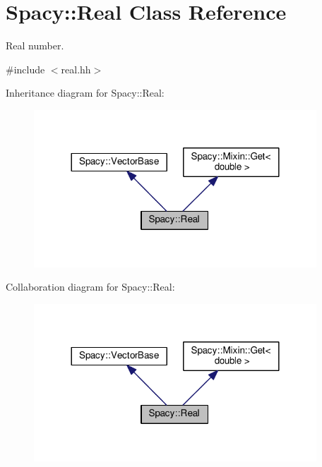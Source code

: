 \hypertarget{classSpacy_1_1Real}{}\section{Spacy\+:\+:Real Class Reference}
\label{classSpacy_1_1Real}


Real number.  




{\ttfamily \#include $<$real.\+hh$>$}



Inheritance diagram for Spacy\+:\+:Real\+:\nopagebreak
\begin{figure}[H]
\begin{center}
\leavevmode
\includegraphics[width=300pt]{classSpacy_1_1Real__inherit__graph}
\end{center}
\end{figure}


Collaboration diagram for Spacy\+:\+:Real\+:\nopagebreak
\begin{figure}[H]
\begin{center}
\leavevmode
\includegraphics[width=300pt]{classSpacy_1_1Real__coll__graph}
\end{center}
\end{figure}
